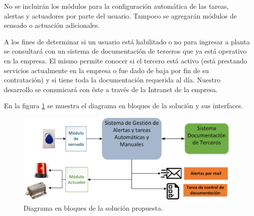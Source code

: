 No se incluirán los módulos para la configuración automática de las tareas, alertas y actuadores por parte del usuario. Tampoco se agregarán módulos de sensado o actuación adicionales.

A los fines de determinar si un usuario está habilitado o no para ingresar a planta se consultará con un sistema de documentación de terceros que ya está operativo en la empresa. El mismo permite conocer si el tercero está activo (está prestando servicios actualmente en la empresa o fue dado de baja por fin de su contratación) y si tiene toda la documentación requerida al día. Nuestro desarrollo se comunicará con éste a través de la Intranet de la empresa.

En la figura \ref{fig:Solucionbasica} se muestra el diagrama en bloques de la solución y sus interfaces.

\begin{figure}[th]
	\centering
	\includegraphics[width=1\textwidth]{./Figures/solucionbasica.png}
	\caption{Diagrama en bloques de la solución propuesta.}
	\label{fig:Solucionbasica}
\end{figure}



